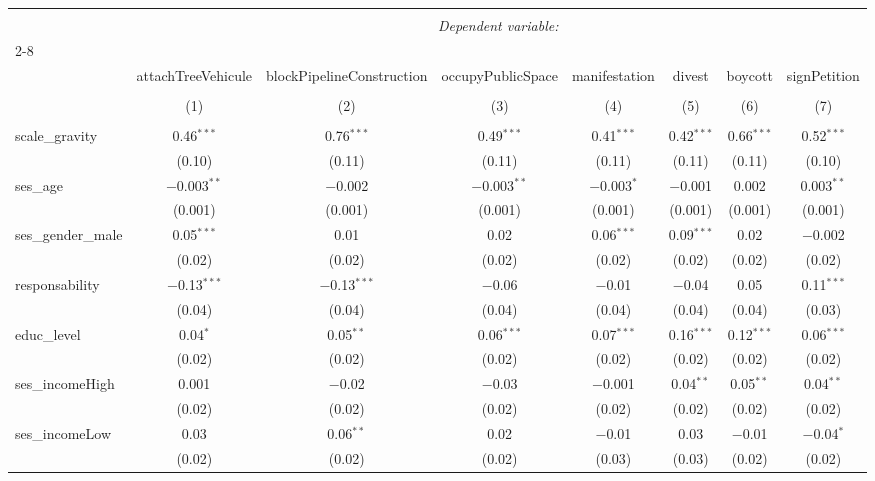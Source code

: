 \documentclass[
]{article}
\begin{document}
\begin{sidewaystable}[!htbp] \centering 
  \caption{Interaction âge-préoccupations 2} 
  \label{} 
\begin{tabular}{@{\extracolsep{1pt}}lccccccc} 
\\[-1.8ex]\hline 
\hline \\[-1.8ex] 
 & \multicolumn{7}{c}{\textit{Dependent variable:}} \\ 
\cline{2-8} 
\\[-1.8ex] & attachTreeVehicule & blockPipelineConstruction & occupyPublicSpace & manifestation & divest & boycott & signPetition \\ 
\\[-1.8ex] & (1) & (2) & (3) & (4) & (5) & (6) & (7)\\ 
\hline \\[-1.8ex] 
 scale\_gravity & 0.46$^{***}$ & 0.76$^{***}$ & 0.49$^{***}$ & 0.41$^{***}$ & 0.42$^{***}$ & 0.66$^{***}$ & 0.52$^{***}$ \\ 
  & (0.10) & (0.11) & (0.11) & (0.11) & (0.11) & (0.11) & (0.10) \\ 
  ses\_age & $-$0.003$^{**}$ & $-$0.002 & $-$0.003$^{**}$ & $-$0.003$^{*}$ & $-$0.001 & 0.002 & 0.003$^{**}$ \\ 
  & (0.001) & (0.001) & (0.001) & (0.001) & (0.001) & (0.001) & (0.001) \\ 
  ses\_gender\_male & 0.05$^{***}$ & 0.01 & 0.02 & 0.06$^{***}$ & 0.09$^{***}$ & 0.02 & $-$0.002 \\ 
  & (0.02) & (0.02) & (0.02) & (0.02) & (0.02) & (0.02) & (0.02) \\ 
  responsability & $-$0.13$^{***}$ & $-$0.13$^{***}$ & $-$0.06 & $-$0.01 & $-$0.04 & 0.05 & 0.11$^{***}$ \\ 
  & (0.04) & (0.04) & (0.04) & (0.04) & (0.04) & (0.04) & (0.03) \\ 
  educ\_level & 0.04$^{*}$ & 0.05$^{**}$ & 0.06$^{***}$ & 0.07$^{***}$ & 0.16$^{***}$ & 0.12$^{***}$ & 0.06$^{***}$ \\ 
  & (0.02) & (0.02) & (0.02) & (0.02) & (0.02) & (0.02) & (0.02) \\ 
  ses\_incomeHigh & 0.001 & $-$0.02 & $-$0.03 & $-$0.001 & 0.04$^{**}$ & 0.05$^{**}$ & 0.04$^{**}$ \\ 
  & (0.02) & (0.02) & (0.02) & (0.02) & (0.02) & (0.02) & (0.02) \\ 
  ses\_incomeLow & 0.03 & 0.06$^{**}$ & 0.02 & $-$0.01 & 0.03 & $-$0.01 & $-$0.04$^{*}$ \\ 
  & (0.02) & (0.02) & (0.02) & (0.03) & (0.03) & (0.02) & (0.02) \\ 

\end{tabular}
\end{sidewaystable}
\end{document}
